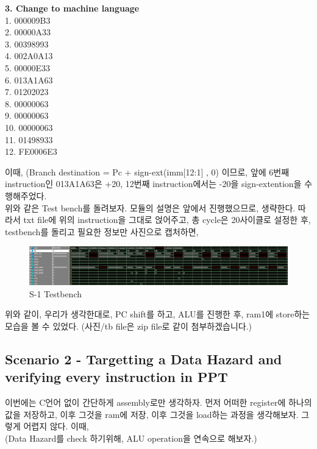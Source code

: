 \documentclass[oneside]{article}
\begin{document}
\begin{center}

\end{center}
\newpage

\begin{center}
\textbf{3. Change to machine language }\\
1.	000009B3\\
2.	00000A33\\
3.	00398993\\
4.	002A0A13\\
5.	00000E33\\
6.	013A1A63\\
7.	01202023\\
8.	00000063\\
9.	00000063\\
10.	00000063\\
11.	01498933\\
12.	FE0006E3\\
\end{center}

이때, (Branch destination = Pc + sign-ext(imm[12:1] , 0) 이므로, 앞에 6번째 instruction인 013A1A63은 +20, 12번째 instruction에서는 -20을 sign-extention을 수행해주었다.\\
위와 같은 Test bench를 돌려보자. 모듈의 설명은 앞에서 진행했으므로, 생략한다. 따라서 txt file에 위의 instruction을 그대로 얹어주고, 총 cycle은 20사이클로 설정한 후, testbench를 돌리고 필요한 정보만 사진으로 캡처하면, 
\begin{figure}[h]
    \includegraphics[width = 18cm]{Asic_s1.png}
    \centering
    \caption{S-1 Testbench}
\end{figure}
위와 같이, 우리가 생각한대로, PC shift를 하고, ALU를 진행한 후, ram1에 store하는 모습을 볼 수 있었다. (사진/tb file은 zip file로 같이 첨부하겠습니다.)

\subsection{Scenario 2 - Targetting a Data Hazard and verifying every instruction in PPT}
이번에는 C언어 없이 간단하게 assembly로만 생각하자. 먼저 어떠한 register에 하나의 값을 저장하고, 이후 그것을 ram에 저장, 이후 그것을 load하는 과정을 생각해보자. 그렇게 어렵지 않다. 이때, 
\\(Data Hazard를 check 하기위해, ALU operation을 연속으로 해보자.) 
\end{document}
